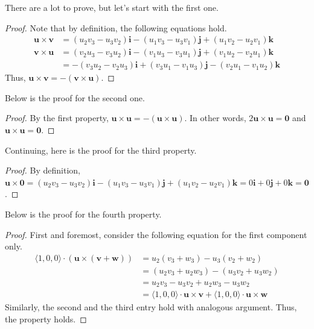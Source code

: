 \documentclass[../../main.tex]{subfiles}
\begin{document}
There are a lot to prove, but let's start with the first one.

\begin{proof}
Note that by definition, the following equations hold.
\begin{align*}
    \mathbf{u} \times \mathbf{v}
    &= (u_2v_3 - u_3v_2) \mathbf{i} - (u_1v_3 - u_3v_1) \mathbf{j}
        + (u_1v_2 - u_2v_1) \mathbf{k} \\
    \mathbf{v} \times \mathbf{u}
    &= (v_2u_3 - v_3u_2) \mathbf{i} - (v_1u_3 - v_3u_1) \mathbf{j}
        + (v_1u_2 - v_2u_1) \mathbf{k} \\
    &= -(v_3u_2 - v_2u_3) \mathbf{i} + (v_3u_1 - v_1u_3) \mathbf{j}
        - (v_2u_1 - v_1u_2) \mathbf{k}
\end{align*}
Thus, $\mathbf{u} \times \mathbf{v} =
- (\mathbf{v} \times \mathbf{u})$.
\end{proof}

Below is the proof for the second one.

\begin{proof}
By the first property, $\mathbf{u} \times \mathbf{u} =
- (\mathbf{u} \times \mathbf{u})$. In other words,
$2 \mathbf{u} \times \mathbf{u} = \mathbf{0}$ and
$\mathbf{u} \times \mathbf{u} = \mathbf{0}$.
\end{proof}

Continuing, here is the proof for the third property.

\begin{proof}
By definition, $\mathbf{u} \times \mathbf{0} = (u_2v_3 - u_3v_2)
\mathbf{i} - (u_1v_3 - u_3v_1) \mathbf{j} + (u_1v_2 - u_2v_1)
\mathbf{k} = 0\mathbf{i} + 0\mathbf{j} + 0\mathbf{k} = \mathbf{0}$.
\end{proof}

Below is the proof for the fourth property.

\begin{proof}
First and foremost, consider the following equation for the
first component only.
\begin{align*}
    \langle 1, 0, 0 \rangle \cdot
        (\mathbf{u} \times (\mathbf{v} + \mathbf{w}))
    &= u_2(v_3 + w_3) - u_3(v_2 + w_2) \\
    &= (u_2v_3 + u_2w_3) - (u_3v_2 + u_3w_2) \\
    &= u_2v_3 - u_3v_2 + u_2w_3 - u_3w_2 \\
    &= \langle 1, 0, 0 \rangle \cdot \mathbf{u} \times \mathbf{v}
        + \langle 1, 0, 0 \rangle \cdot \mathbf{u} \times \mathbf{w}
\end{align*}
Similarly, the second and the third entry hold with analogous
argument. Thus, the property holds.
\end{proof}
\end{document}
